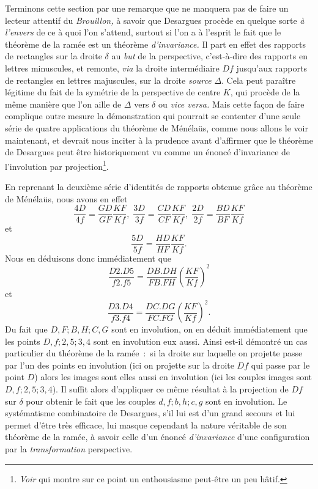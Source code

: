 \documentclass[12pt, a4paper]{article}
\begin{document}
Terminons cette section par une remarque que ne manquera pas de faire un lecteur attentif du \textit{Brouillon,} à savoir que Desargues procède en quelque sorte \textit{à l'envers} de ce à quoi l'on s'attend, surtout si l'on a à l'esprit le fait que le théorème de la ramée est un théorème \textit{d'invariance.} Il part en effet des rapports de rectangles sur la droite $\delta$ au \textit{but} de la perspective, c'est-à-dire des rapports en lettres minuscules, et remonte, \textit{via} la droite intermédiaire $Df$ jusqu'aux rapports de rectangles en lettres majuscules, sur la droite \textit{source} $\Delta$. Cela peut paraître légitime du fait de la symétrie de la perspective de centre $K$, qui procède de la même manière que l'on aille de $\Delta$ vers $\delta$ ou \textit{vice versa.} Mais cette façon de faire complique outre mesure la démonstration qui pourrait se contenter d'une seule série de quatre applications du théorème de Ménélaüs, comme nous allons le voir maintenant, et devrait nous inciter à la prudence avant d'affirmer que le théorème de Desargues peut être historiquement vu comme un énoncé d'invariance de l'involution par projection\footnote{{\it Voir} \cite{legoff} qui montre sur ce point un enthousiasme peut-être un peu hâtif.}.

En reprenant la deuxième série d'identités de rapports obtenue grâce au théorème de Ménélaüs, nous avons en effet
\[
\frac{4D}{4f}=\frac{GD}{GF}\frac{KF}{Kf},\;\frac{3D}{3f}=\frac{CD}{CF}\frac{KF}{Kf},\;\frac{2D}{2f}=\frac{BD}{BF}\frac{KF}{Kf}
\]
et
\[
\frac{5D}{5f}=\frac{HD}{HF}\frac{KF}{Kf}.
\]
Nous en déduisons donc immédiatement que
\[
\frac{D2.D5}{f2.f5}=\frac{DB.DH}{FB.FH}\left(\frac{KF}{Kf}\right)^2
\]
et
\[
\frac{D3.D4}{f3.f4}=\frac{DC.DG}{FC.FG}\left(\frac{KF}{Kf}\right)^2.
\]
Du fait que $D,F;B,H;C,G$ sont en involution, on en déduit immédiatement que les points $D,f;2,5;3,4$ sont en involution eux aussi. Ainsi est-il démontré un cas particulier du théorème de la ramée~:~si la droite sur laquelle on projette passe par l'un des points en involution (ici on projette sur la droite $Df$ qui passe par le point $D$) alors les images sont elles aussi en involution (ici les couples images sont $D,f;2,5;3,4$). Il suffit alors d'appliquer ce même résultat à la projection de $Df$ sur $\delta$ pour obtenir le fait que les couples $d,f;b,h;c,g$ sont en involution. Le systématisme combinatoire de Desargues, s'il lui est d'un grand secours et lui permet d'être très efficace, lui masque cependant la nature véritable de son théorème de la ramée, à savoir celle d'un énoncé \textit{d'invariance} d'une configuration par la \textit{transformation} perspective. 
\end{document}
